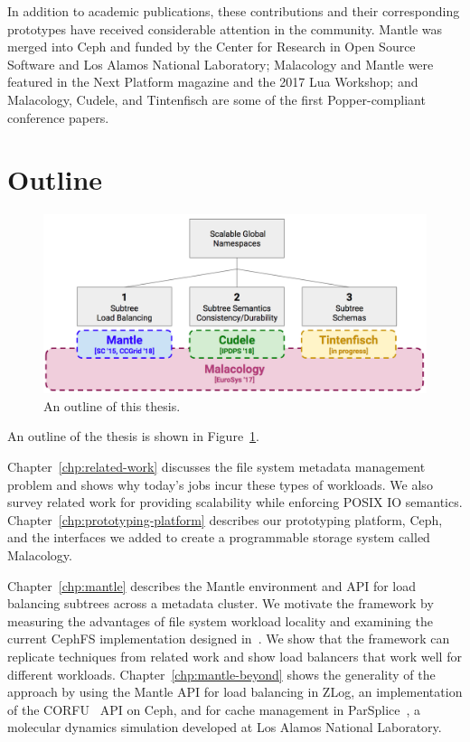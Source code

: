 In addition to academic publications, these contributions and their
corresponding prototypes have received considerable attention in the community.
Mantle was merged into Ceph and funded by the Center for Research in Open
Source Software and Los Alamos National Laboratory; Malacology and Mantle were
featured in the Next Platform magazine and the 2017 Lua Workshop; and
Malacology, Cudele, and Tintenfisch are some of the first
Popper-compliant~\cite{jimenez:ipdpsw17-popper} conference papers.

\section{Outline}

\begin{figure}[tb]
  \centering
  \includegraphics[width=1\textwidth]{./chapters/overview.png}
  \caption{An outline of this thesis.}
  \label{fig:thesis-overview}
\end{figure}

An outline of the thesis is shown in Figure~\ref{fig:thesis-overview}.

Chapter~\ref{chp:related-work} discusses the file system metadata management
problem and shows why today's jobs incur these types of workloads. We also
survey related work for providing scalability while enforcing POSIX IO
semantics. Chapter~\ref{chp:prototyping-platform} describes our prototyping
platform, Ceph, and the interfaces we added to create a programmable storage
system called Malacology.

Chapter~\ref{chp:mantle} describes the Mantle environment and API for load
balancing subtrees across a metadata cluster. We motivate the framework by
measuring the advantages of file system workload locality and examining the
current CephFS implementation designed in~\cite{weil:osdi2006-ceph,
weil:sc2004-dyn-metadata}. We show that the framework can replicate techniques
from related work and show load balancers that work well for different
workloads. Chapter~\ref{chp:mantle-beyond} shows the generality of the approach
by using the Mantle API for load balancing in ZLog, an implementation of the
CORFU~\cite{balakrishnan_corfu_2012} API on Ceph, and for cache management in
ParSplice~\cite{perez:jctc20150parsplice}, a molecular dynamics simulation
developed at Los Alamos National Laboratory.

